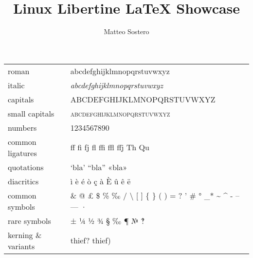 \documentclass[11pt,a4paper]{article}
\author{Matteo Sostero}
\title{Linux Libertine \LaTeX{} Showcase}
\begin{document}
\newcommand{\U}[1]{\symbol{"#1}}

\maketitle

\centering

\begin{tabular}{ll}
\toprule
roman               & abcdefghijklmnopqrstuvwxyz                                                          \\
italic              & \emph{abcdefghijklmnopqrstuvwxyz}                                                   \\
capitals            & \uppercase{abcdefghijklmnopqrstuvwxyz}                                              \\
small capitals      & \textsc{abcdefghijklmnopqrstuvwxyz}                                                 \\
numbers             & 1234567890                                                                          \\
common ligatures    & ff fi fj fl ffi ffl ffj Th Qu                                                       \\
quotations          & ‘bla’ “bla” «bla»                                                                   \\
diacritics          & ì è é ò ç à È û ê ë                                                                 \\
common symbols      & \& @ £ \$ \% ‰ / \textbackslash{} [ ] \{ \} ( ) = ? ' \# ° \_* \~{} \^{} - -- --- · \\
rare symbols        & ± ¼ ½ ¾ § ‰ ¶ № ‽                                                                   \\
kerning \& variants & thief? thief)                                                                       \\
\bottomrule
\end{tabular}

\vfill
\end{document}
